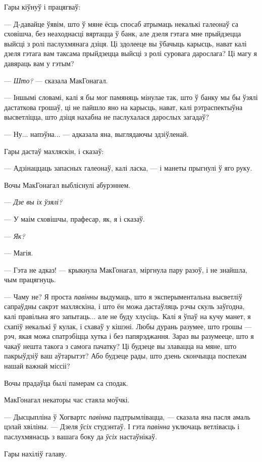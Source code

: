 Гары кіўнуў і працягваў:

--- Д-давайце ўявім, што ў мяне ёсць спосаб атрымаць некалькі галеонаў са 
сховішча, без неаходнасці вяртацца ў банк, але дзеля гэтага мне 
прыйдзецца выйсці з ролі паслухмянага дзіця. Ці здолееце вы ўбачыць карысць,
нават калі дзеля гэтага вам таксама прыйдзецца выйсці з ролі суровага 
дарослага? Ці магу я давяраць вам у гэтым?

--- \emph{Што?} --- сказала МакГонагал.

--- Іншымі словамі, калі я бы мог памяняць мінулае так, што ў банку мы бы 
ўзялі дастаткова грошаў, ці не пайшло яно на карысць, нават, калі рэтраспектыўна 
высветліцца, што дзіця нахабна не паслухалася дарослых загадаў?

--- Ну... напэўна... --- адказала яна, выглядаючы здзіўленай.

Гары дастаў махляскін, і сказаў:

--- Адзінаццаць запасных галеонаў, калі ласка, --- і манеты прыгнулі ў яго руку.

Вочы МакГонагал выбліснулі абурэннем.

--- \emph{Дзе вы іх ўзялі?}

--- У маім сховішчы, прафесар, як, я і сказаў.

--- \emph{Як?}

--- Магія.

--- Гэта не адказ! --- крыкнула МакГонагал, міргнула пару разоў, і не знайшла, 
чым працягнуць.

--- Чаму не? Я проста \emph{павінны} выдумаць, што я эксперыментальна высветліў
сапраўдны сакрэт махляскіна, і што ён можа дастаўляць рэчы скуль заўгодна,
калі правільна яго запытаць... але не буду хлусіць.
Калі я ўпаў на кучу манет, я схапіў некалькі ў кулак,
і схаваў у кішэні. Любы дурань разумее, што грошы --- рэч, якая можа 
спатрэбіцца хутка і без папярэджання. Зараз вы разумееце, што я чакаў нешта такога з самога пачатку? Ці будзеце вы злавацца на мяне, што пакрыўдзіў ваш 
аўтарытэт? Або будзеце рады, што дзень скончыцца поспехам нашай важнай міссіі?

Вочы прадаўца былі памерам са сподак.

МакГонагал некаторы час стаяла моўчкі.

--- Дысцыпліна ў Хогвартс \emph{павінна} падтрымлівацца, --- сказала яна пасля амаль
цэлай хвіліны. --- Дзеля \emph{ўсіх} студэнтаў. 
І гэта \emph{павінна} уключаць ветлівасць і паслухмянасць з вашага боку да
\emph{ўсіх} настаўнікаў.

Гары нахіліў галаву.


